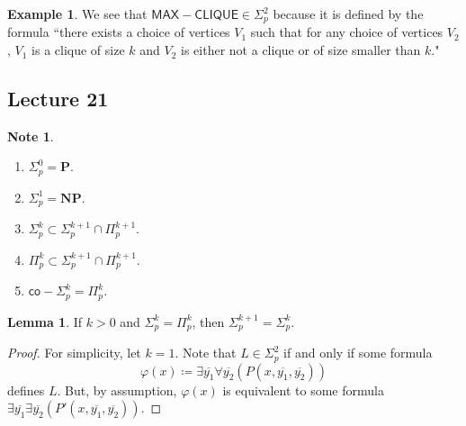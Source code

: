 \documentclass[10pt,letterpaper,cm]{nupset}
\theoremstyle{definition}
\newtheorem{exmp}[definition]{Example}
\newtheorem{note}[definition]{Note}
\theoremstyle{theorem}
\newtheorem{lemma}[definition]{Lemma}
\theoremstyle{remark}
\newcommand{\1}{\mathbf{1}}
\newcommand{\0}{\vec 0}
\begin{document}
\begin{exmp} 
We see that $\mathsf{MAX{-}CLIQUE} \in \Sigma^2_p$ because it is defined by the formula ``there exists a choice of vertices $V_1$ such that for any choice of vertices $V_2$, $V_1$ is a clique of size $k$ and $V_2$ is either not a clique or of size smaller than $k$."
\end{exmp}

\subsection{Lecture 21}

\begin{note} $ $
\begin{enumerate}
\item $\Sigma_p^0 = \mathbf{P}$.
\item $\Sigma_p^1 = \mathbf{NP} $.
\item $\Sigma^k_p \subset \Sigma^{k+1}_p \cap \Pi^{k+1}_p$.
\item $\Pi^k_p \subset \Sigma^{k+1}_p \cap \Pi^{k+1}_p$.
\item $\mathsf{co}{-}\Sigma^k_p = \Pi^k_p$. 
\end{enumerate}
\end{note}

\begin{lemma}
If $k>0$ and $\Sigma_p^k = \Pi^k_p$, then $\Sigma^{k+1}_p = \Sigma^k_p$.
\end{lemma}
\begin{proof}
For simplicity, let $k=1$. Note that $L \in \Sigma^2_p$ if and only if some formula $$\varphi(x)\coloneqq \exists{\overline{y_1}}\forall{\overline{y_2}}\left(P\left(x, \overline{y_1}, \overline{y_2}\right)\right)$$ defines $L$. But, by assumption, $\varphi(x)$ is equivalent to some formula  $ \exists{\overline{y_1}}\exists{\overline{y_2}}\left(P'\left(x, \overline{y_1}, \overline{y_2}\right)\right)$.
\end{proof}
\end{document}
